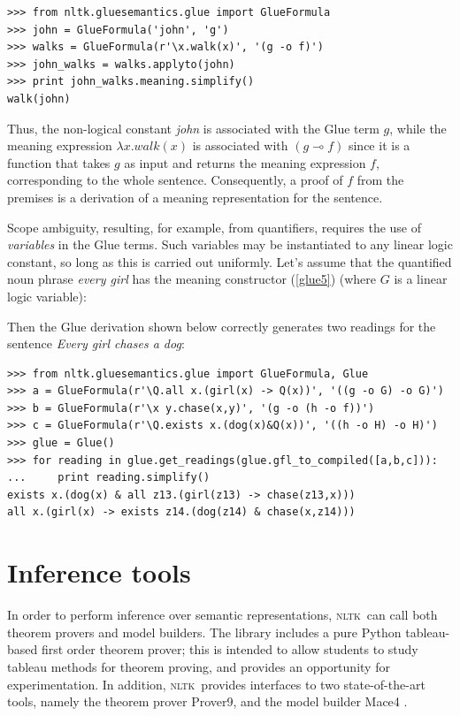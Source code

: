 \documentclass[11pt, a4paper]{article}
\newcommand{\NLTK}{\textsc{nltk}}
\begin{document}
\begin{Verbatim}
>>> from nltk.gluesemantics.glue import GlueFormula
>>> john = GlueFormula('john', 'g')
>>> walks = GlueFormula(r'\x.walk(x)', '(g -o f)')
>>> john_walks = walks.applyto(john)
>>> print john_walks.meaning.simplify()
walk(john)
\end{Verbatim}
Thus, the non-logical constant \textit{john} is associated with the
Glue term $g$, while the meaning expression $\lambda x.walk(x)$ is
associated with $(g \multimap f)$ since it is a function that
takes $g$ as input and returns the meaning expression $f$,
corresponding to the whole
sentence.  Consequently, a proof of $f$ from the premises is a derivation
of a meaning representation for the sentence.

Scope ambiguity, resulting, for example, from quantifiers, requires the
use of \textit{variables} in the Glue terms. Such variables may be
instantiated to any linear logic constant, so long as this is carried
out uniformly. Let's assume that the quantified noun phrase
\textit{every girl} has the meaning constructor (\ref{glue5}) (where
$G$ is a linear logic variable):

Then the Glue derivation shown below correctly
generates two readings for the sentence \textit{Every girl chases a dog}:
\begin{Verbatim}
>>> from nltk.gluesemantics.glue import GlueFormula, Glue
>>> a = GlueFormula(r'\Q.all x.(girl(x) -> Q(x))', '((g -o G) -o G)')
>>> b = GlueFormula(r'\x y.chase(x,y)', '(g -o (h -o f))')
>>> c = GlueFormula(r'\Q.exists x.(dog(x)&Q(x))', '((h -o H) -o H)')
>>> glue = Glue()
>>> for reading in glue.get_readings(glue.gfl_to_compiled([a,b,c])):
...     print reading.simplify()
exists x.(dog(x) & all z13.(girl(z13) -> chase(z13,x)))
all x.(girl(x) -> exists z14.(dog(z14) & chase(x,z14)))
\end{Verbatim}


\section{Inference tools}
In order to perform inference over semantic representations, \NLTK\
can call both theorem provers and model builders.
The library includes a pure Python tableau-based first order theorem prover;
this is intended to allow students to study 
tableau methods for theorem proving, and provides an
opportunity for experimentation.  In addition, \NLTK\ provides
interfaces to two state-of-the-art tools, namely the theorem prover Prover9, 
and the model builder Mace4  \citep{McCune}.  %
\end{document}
